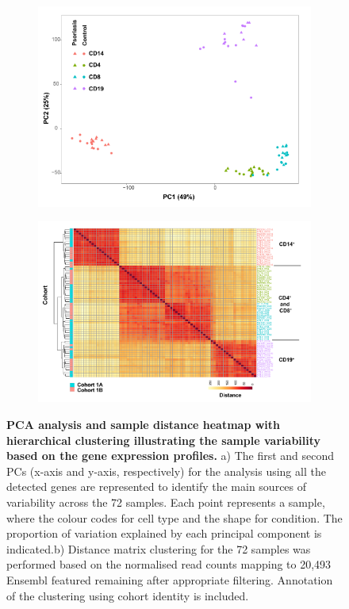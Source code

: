 \begin{figure}[htbp]
\centering
\begin{subfigure}{0.5\textwidth}
\centering
\includegraphics[width=\textwidth]{./Results2/pdfs/PS_CTL_all_samples_varied_PCA1and2_plot}
\caption{\textbf{}}
\end{subfigure}
\begin{subfigure}{0.5\textwidth}
\centering
\includegraphics[width=\textwidth]{./Results2/pdfs/PS_CTL_all_samples_heatmap_including_batch}
\caption{\textbf{}}
\end{subfigure}
\caption[PCA analysis and sample distance heatmap with hierarchical clustering illustrating the sample variability based on the gene expression profiles.]{\textbf{PCA analysis and sample distance heatmap with hierarchical clustering illustrating the sample variability based on the gene expression profiles.} a) The first and second PCs (x-axis and y-axis, respectively) for the analysis using all the detected genes are represented to identify the main sources of variability across the 72 samples. Each point represents a sample, where the colour codes for cell type and the shape for condition. The proportion of variation explained by each principal component is indicated.b) Distance matrix clustering for the 72 samples was performed based on the normalised read counts mapping to 20,493 Ensembl featured remaining after appropriate filtering. Annotation of the clustering using cohort identity is included.}

\end{figure}
